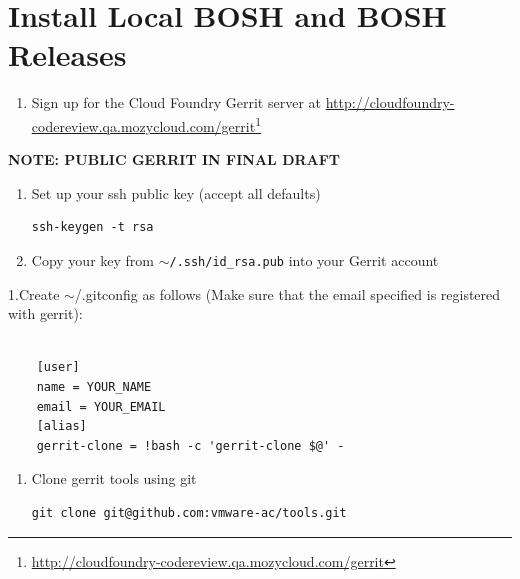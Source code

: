 \section{Install Local BOSH and BOSH Releases}
\label{installlocalboshandboshreleases}

\begin{enumerate}
\item Sign up for the Cloud Foundry Gerrit server at \href{http://cloudfoundry-codereview.qa.mozycloud.com/gerrit}{http:/\slash cloudfoundry-codereview.qa.mozycloud.com\slash gerrit}\footnote{\href{http://cloudfoundry-codereview.qa.mozycloud.com/gerrit}{http:/\slash cloudfoundry-codereview.qa.mozycloud.com\slash gerrit}}

\end{enumerate}

\textbf{NOTE: PUBLIC GERRIT IN FINAL DRAFT}

\begin{enumerate}
\item Set up your ssh public key (accept all defaults)

\begin{verbatim}
ssh-keygen -t rsa
\end{verbatim}


\item Copy your key from \texttt{\ensuremath{\sim}\slash .ssh\slash id\_rsa.pub} into your Gerrit account

\end{enumerate}

1.Create \ensuremath{\sim}\slash .gitconfig as follows (Make sure that the email specified is registered with gerrit):

\begin{adjustwidth}{2.5em}{2.5em}
\begin{verbatim}

    [user]
    name = YOUR_NAME
    email = YOUR_EMAIL
    [alias]
    gerrit-clone = !bash -c 'gerrit-clone $@' -

\end{verbatim}
\end{adjustwidth}

\begin{enumerate}
\item Clone gerrit tools using git

\begin{verbatim}
git clone git@github.com:vmware-ac/tools.git
\end{verbatim}


\end{enumerate}

